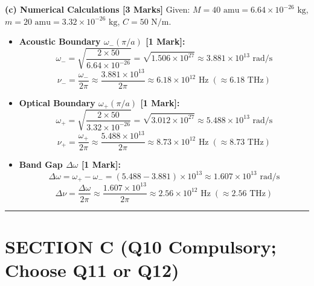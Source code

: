 \documentclass[10pt,a4paper,twocolumn]{article}
\begin{document}
\textbf{(c) Numerical Calculations [3 Marks]}
Given: $M = 40\text{ amu} = 6.64 \times 10^{-26}\text{ kg}$, $m = 20\text{ amu} = 3.32 \times 10^{-26}\text{ kg}$, $C = 50\text{ N/m}$.
\begin{itemize}
    \item \textbf{Acoustic Boundary $\omega_-(\pi/a)$ [1 Mark]:}
    $$\omega_- = \sqrt{\frac{2 \times 50}{6.64 \times 10^{-26}}} = \sqrt{1.506 \times 10^{27}} \approx 3.881 \times 10^{13}\text{ rad/s}$$
    $$\nu_- = \frac{\omega_-}{2\pi} \approx \frac{3.881\times10^{13}}{2\pi} \approx 6.18 \times 10^{12}\text{ Hz} \;(\approx 6.18\text{ THz})$$
    \item \textbf{Optical Boundary $\omega_+(\pi/a)$ [1 Mark]:}
    $$\omega_+ = \sqrt{\frac{2 \times 50}{3.32 \times 10^{-26}}} = \sqrt{3.012 \times 10^{27}} \approx 5.488 \times 10^{13}\text{ rad/s}$$
    $$\nu_+ = \frac{\omega_+}{2\pi} \approx \frac{5.488\times10^{13}}{2\pi} \approx 8.73 \times 10^{12}\text{ Hz} \;(\approx 8.73\text{ THz})$$
    \item \textbf{Band Gap $\Delta\omega$ [1 Mark]:}
    $$\Delta\omega = \omega_+ - \omega_- = (5.488 - 3.881) \times 10^{13} \approx 1.607 \times 10^{13}\text{ rad/s}$$
    $$\Delta\nu = \frac{\Delta\omega}{2\pi} \approx \frac{1.607\times10^{13}}{2\pi} \approx 2.56 \times 10^{12}\text{ Hz} \;(\approx 2.56\text{ THz})$$
\end{itemize}

\vspace{-0.3em}
\hrule
\vspace{0.6em}

\section*{SECTION C (Q10 Compulsory; Choose Q11 or Q12)}
\end{document}
